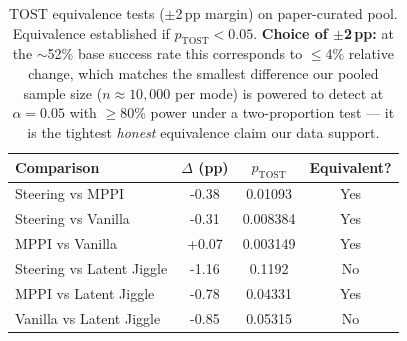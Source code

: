 \begin{table}[t]
\centering
\caption{TOST equivalence tests ($\pm$2\,pp margin) on paper-curated pool. Equivalence established if $p_{\mathrm{TOST}} < 0.05$. \textbf{Choice of $\pm$2\,pp:} at the $\sim$52\% base success rate this corresponds to $\le$4\% relative change, which matches the smallest difference our pooled sample size ($n{\approx}10{,}000$ per mode) is powered to detect at $\alpha{=}0.05$ with $\ge$80\% power under a two-proportion test --- it is the tightest \emph{honest} equivalence claim our data support.}
\label{tab:equivalence_tost}
\begin{tabular}{lccc}
\toprule
Comparison & $\Delta$ (pp) & $p_{\mathrm{TOST}}$ & Equivalent? \\
\midrule
Steering vs MPPI & -0.38 & 0.01093 & Yes \\
Steering vs Vanilla & -0.31 & 0.008384 & Yes \\
MPPI vs Vanilla & +0.07 & 0.003149 & Yes \\
Steering vs Latent Jiggle & -1.16 & 0.1192 & No \\
MPPI vs Latent Jiggle & -0.78 & 0.04331 & Yes \\
Vanilla vs Latent Jiggle & -0.85 & 0.05315 & No \\
\bottomrule
\end{tabular}
\end{table}
